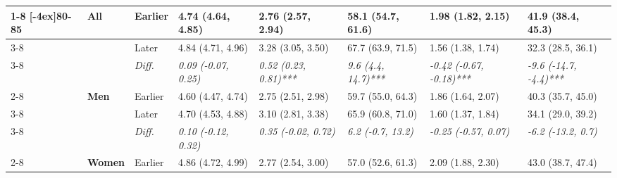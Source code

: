 \documentclass[12pt, a4paper]{article}
\begin{document}
\begin{appendices}
\begin{table}[!p]
{\begin{tabular}[t]{>{}l>{}lllllll}
        \cmidrule{1-8}
        \multirow{9}{*}[-4ex]{\textbf{80-85}} & \multirow{3}{*}{\textbf{All}}   & Earlier                       & 4.74 (4.64, 4.85)                           & 2.76 (2.57, 2.94)                            & 58.1 (54.7, 61.6)                           & 1.98 (1.82, 2.15)                               & 41.9 (38.4, 45.3)                              \\
        \cmidrule{3-8}
                                              &                                 & Later                         & 4.84 (4.71, 4.96)                           & 3.28 (3.05, 3.50)                            & 67.7 (63.9, 71.5)                           & 1.56 (1.38, 1.74)                               & 32.3 (28.5, 36.1)                              \\
        \cmidrule{3-8}
                                              &                                 & \cellcolor{gray!10}\em{Diff.} & \cellcolor{gray!10}\em{0.09 (-0.07, 0.25)}  & \cellcolor{gray!10}\em{0.52 (0.23, 0.81)***} & \cellcolor{gray!10}\em{9.6 (4.4, 14.7)***}  & \cellcolor{gray!10}\em{-0.42 (-0.67, -0.18)***} & \cellcolor{gray!10}\em{-9.6 (-14.7, -4.4)***}  \\
        \cmidrule{2-8}
                                              & \multirow{3}{*}{\textbf{Men}}   & Earlier                       & 4.60 (4.47, 4.74)                           & 2.75 (2.51, 2.98)                            & 59.7 (55.0, 64.3)                           & 1.86 (1.64, 2.07)                               & 40.3 (35.7, 45.0)                              \\
        \cmidrule{3-8}
                                              &                                 & Later                         & 4.70 (4.53, 4.88)                           & 3.10 (2.81, 3.38)                            & 65.9 (60.8, 71.0)                           & 1.60 (1.37, 1.84)                               & 34.1 (29.0, 39.2)                              \\
        \cmidrule{3-8}
                                              &                                 & \cellcolor{gray!10}\em{Diff.} & \cellcolor{gray!10}\em{0.10 (-0.12, 0.32)}  & \cellcolor{gray!10}\em{0.35 (-0.02, 0.72)}   & \cellcolor{gray!10}\em{6.2 (-0.7, 13.2)}    & \cellcolor{gray!10}\em{-0.25 (-0.57, 0.07)}     & \cellcolor{gray!10}\em{-6.2 (-13.2, 0.7)}      \\
        \cmidrule{2-8}
                                              & \multirow{3}{*}{\textbf{Women}} & Earlier                       & 4.86 (4.72, 4.99)                           & 2.77 (2.54, 3.00)                            & 57.0 (52.6, 61.3)                           & 2.09 (1.88, 2.30)                               & 43.0 (38.7, 47.4)                              \\

\end{tabular}}
\end{table}
\end{appendices}
\end{document}
